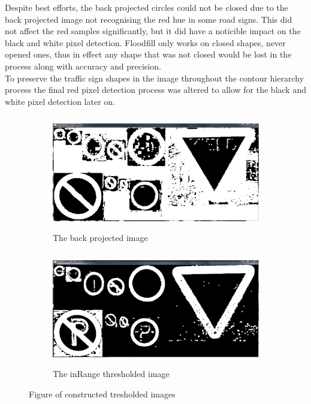\documentclass{article}
\begin{document}
Despite best efforts, the back projected circles could not be closed due to the back projected image not recognising the red hue in some road signs. This did not affect the red samples significantly, but it did have a noticible impact on the black and white pixel detection. Floodfill only works on closed shapes, never opened ones, thus in effect any shape that was not closed would be lost in the process along with accuracy and precision.\\


To preserve the traffic sign shapes in the image throughout the contour hierarchy process the final red pixel detection process was altered to allow for the black and white pixel detection later on.\\
\begin{figure}[H]
\begin{subfigure}{0.5\textwidth}
\includegraphics[width=0.9\linewidth, height=5cm]{N_DIL_THRESH_BKPROJ.PNG} 
\caption{The back projected image}
\label{fig:subim1}
\end{subfigure}
\begin{subfigure}{0.5\textwidth}

\includegraphics[width=0.9\linewidth, height=5cm]{N_MORPH_DIL_INRNG.PNG}
\caption{The inRange thresholded image}
\label{fig:subim2}
\end{subfigure}
\caption{Figure of constructed tresholded images}
\label{fig:image2}
\end{figure}
\end{document}
